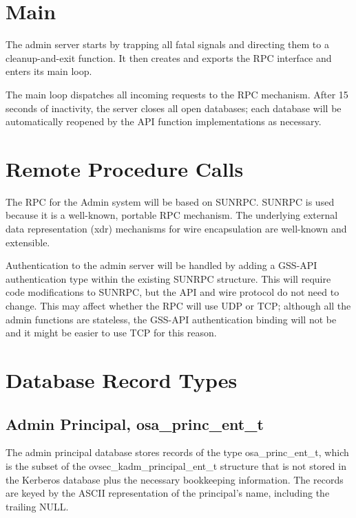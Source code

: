 \section{Main}

The admin server starts by trapping all fatal signals and directing
them to a cleanup-and-exit function.  It then creates and exports the
RPC interface and enters its main loop.

The main loop dispatches all incoming requests to the RPC mechanism.
After 15 seconds of inactivity, the server closes all open databases;
each database will be automatically reopened by the API function
implementations as necessary.

\section{Remote Procedure Calls}

The RPC for the Admin system will be based on SUNRPC.  SUNRPC is used
because it is a well-known, portable RPC mechanism.  The underlying
external data representation (xdr) mechanisms for wire encapsulation
are well-known and extensible.


Authentication to the admin server will be handled by adding a GSS-API
authentication type within the existing SUNRPC structure.  This will
require code modifications to SUNRPC, but the API and wire protocol do
not need to change.  This may affect whether the RPC will use UDP or
TCP; although all the admin functions are stateless, the GSS-API
authentication binding will not be and it might be easier to use TCP
for this reason.

\section{Database Record Types}
\label{sec:db-types}

\subsection{Admin Principal, osa_princ_ent_t}

The admin principal database stores records of the type
osa_princ_ent_t, which is the subset of the ovsec_kadm_principal_ent_t
structure that is not stored in the Kerberos database plus the
necessary bookkeeping information.  The records are keyed by the ASCII
representation of the principal's name, including the trailing NULL.

